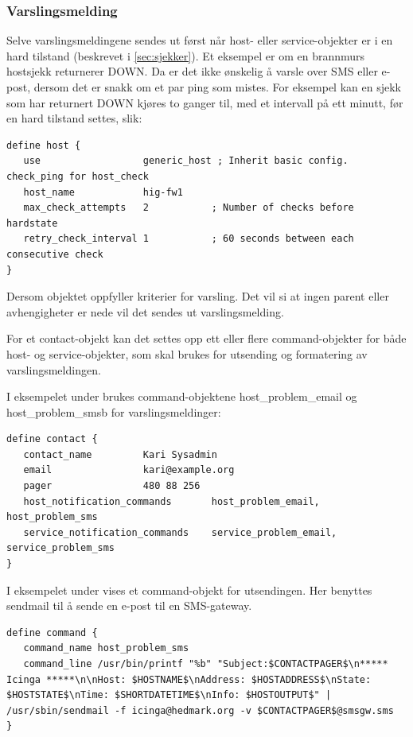 \subsubsection{Varslingsmelding}
Selve varslingsmeldingene sendes ut først når host- eller service-objekter er i en hard tilstand (beskrevet i \ref{sec:sjekker}). Et eksempel er om en brannmurs hostsjekk returnerer DOWN. Da er det ikke ønskelig å varsle over SMS eller e-post, dersom det er snakk om et par ping som mistes. For eksempel kan en sjekk som har returnert DOWN kjøres to ganger til, med et intervall på ett minutt, før en hard tilstand settes, slik:

\begin{lstlisting}[style=example]
define host {
   use 					generic_host ; Inherit basic config. check_ping for host_check
   host_name			hig-fw1
   max_check_attempts   2 			; Number of checks before hardstate
   retry_check_interval	1 			; 60 seconds between each consecutive check
}
\end{lstlisting}
Dersom objektet oppfyller kriterier for varsling. Det vil si at ingen parent eller avhengigheter er nede vil det sendes ut varslingsmelding.
 
For et contact-objekt kan det settes opp ett eller flere command-objekter for både host- og service-objekter, som skal brukes for utsending og formatering av varslingsmeldingen.  

I eksempelet under brukes command-objektene host\_problem\_email og host\_problem\_smsb for varslingsmeldinger:
\begin{lstlisting}[style=example]
define contact {
   contact_name 		Kari Sysadmin
   email 				kari@example.org
   pager 				480 88 256 
   host_notification_commands    	host_problem_email, host_problem_sms
   service_notification_commands 	service_problem_email, service_problem_sms
}
\end{lstlisting}

I eksempelet under vises et command-objekt for utsendingen. Her benyttes sendmail\cite{wiki:sendmail} til å sende en e-post til en SMS-gateway.
\begin{lstlisting}[style=example]
define command {
   command_name host_problem_sms
   command_line /usr/bin/printf "%b" "Subject:$CONTACTPAGER$\n***** Icinga *****\n\nHost: $HOSTNAME$\nAddress: $HOSTADDRESS$\nState: $HOSTSTATE$\nTime: $SHORTDATETIME$\nInfo: $HOSTOUTPUT$" | /usr/sbin/sendmail -f icinga@hedmark.org -v $CONTACTPAGER$@smsgw.sms
}
\end{lstlisting}

